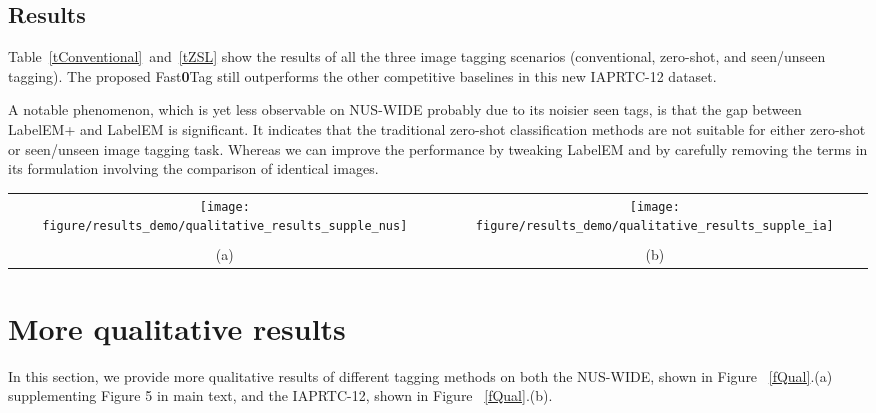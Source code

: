 \documentclass[10pt,twocolumn,letterpaper]{article}
\newcommand{\ours}{{Fast\textbf{0}Tag}}
\begin{document}
\subsection{Results}

Table~\ref{tConventional}~and~\ref{tZSL} show the results of all the three image tagging scenarios (conventional, zero-shot, and seen/unseen tagging). The proposed {\ours} still outperforms the other competitive baselines in this new IAPRTC-12 dataset.





A notable phenomenon, which is yet less observable on NUS-WIDE probably due to its noisier seen tags, is that the gap between LabelEM+ and LabelEM is significant. It indicates that the traditional zero-shot classification methods are not suitable for either zero-shot or seen/unseen image tagging task. Whereas we can improve the performance by tweaking LabelEM and by carefully removing the terms in its formulation involving the comparison of identical images.





\begin{figure*}
\vspace{4 pt}
\begin{tabular}{cc}
   \texttt{[image: figure/results\_demo/qualitative\_results\_supple\_nus]} & \texttt{[image: figure/results\_demo/qualitative\_results\_supple\_ia]}\\
   \vspace{2 pt}\\
   (a) & (b)
\end{tabular}
   \caption{The top five tags for  exemplar images in ~\cite{chua_nus-wide:_2009}(a) and ~\cite{grubinger_iapr_2006}(b) returned by  {\ours} on the conventional, zero-shot, seen/unseen and 4,093 zero-shot image tagging tasks, and by TagProp for conventional tagging. (Correct tags: {\color{green} green}; mistaken tags: {\color{red} red} and \textit{italic})
   }
\label{fQual}  
\end{figure*}


\section{More qualitative results}  \label{squa}

In this section, we provide more qualitative  results of different tagging methods on both the NUS-WIDE, shown in Figure ~\ref{fQual}.(a) supplementing Figure 5 in main text, and the IAPRTC-12, shown in Figure ~\ref{fQual}.(b).
\end{document}

